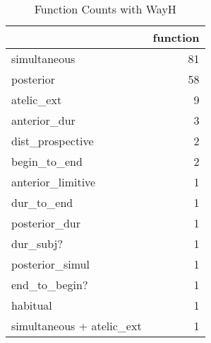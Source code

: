 \begin{table}[htbp!]
\centering
\caption{Function Counts with WayH}
\label{table:WayH_fun_ct}
\begin{tabular}{lr}
\toprule
{} &  function \\
\midrule
simultaneous              &        81 \\
posterior                 &        58 \\
atelic\_ext                &         9 \\
anterior\_dur              &         3 \\
dist\_prospective          &         2 \\
begin\_to\_end              &         2 \\
anterior\_limitive         &         1 \\
dur\_to\_end                &         1 \\
posterior\_dur             &         1 \\
dur\_subj?                 &         1 \\
posterior\_simul           &         1 \\
end\_to\_begin?             &         1 \\
habitual                  &         1 \\
simultaneous + atelic\_ext &         1 \\
\bottomrule
\end{tabular}
\end{table}

